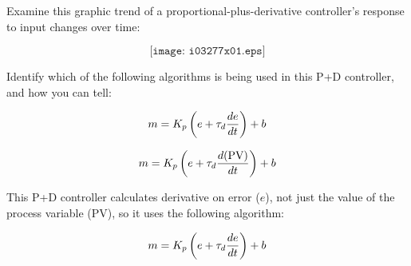 

Examine this graphic trend of a proportional-plus-derivative controller's response to input changes over time:

$$\texttt{[image: i03277x01.eps]}$$

Identify which of the following algorithms is being used in this P+D controller, and how you can tell:

$$m = K_p \left( e + \tau_d {de \over dt} \right) + b$$


$$m = K_p \left( e + \tau_d {d(\hbox{PV}) \over dt} \right) + b$$








This P+D controller calculates derivative on error ($e$), not just the value of the process variable (PV), so it uses the following algorithm:

$$m = K_p \left( e + \tau_d {de \over dt} \right) + b$$











